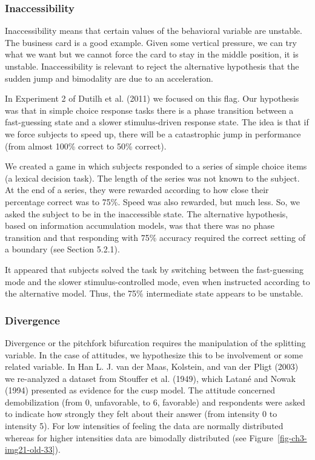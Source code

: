 \documentclass[
  letterpaper,
]{scrbook}
\begin{document}
\hypertarget{inaccessibility}{%
\subsubsection{Inaccessibility}\label{inaccessibility}}

Inaccessibility means that certain values of the behavioral variable are
unstable. The business card is a good example. Given some vertical
pressure, we can try what we want but we cannot force the card to stay
in the middle position, it is unstable. Inaccessibility is relevant to
reject the alternative hypothesis that the sudden jump and bimodality
are due to an acceleration.

In Experiment 2 of Dutilh et al. (2011) we focused on this flag. Our
hypothesis was that in simple choice response tasks there is a phase
transition between a fast-guessing state and a slower stimulus-driven
response state. The idea is that if we force subjects to speed up, there
will be a catastrophic jump in performance (from almost 100\% correct to
50\% correct).

We created a game in which subjects responded to a series of simple
choice items (a lexical decision task). The length of the series was not
known to the subject. At the end of a series, they were rewarded
according to how close their percentage correct was to 75\%. Speed was
also rewarded, but much less. So, we asked the subject to be in the
inaccessible state. The alternative hypothesis, based on information
accumulation models, was that there was no phase transition and that
responding with 75\% accuracy required the correct setting of a boundary
(see Section 5.2.1).

It appeared that subjects solved the task by switching between the
fast-guessing mode and the slower stimulus-controlled mode, even when
instructed according to the alternative model. Thus, the 75\%
intermediate state appears to be unstable.

\hypertarget{divergence}{%
\subsubsection{Divergence}\label{divergence}}

Divergence or the pitchfork bifurcation requires the manipulation of the
splitting variable. In the case of attitudes, we hypothesize this to be
involvement or some related variable. In Han L. J. van der Maas,
Kolstein, and van der Pligt (2003) we re-analyzed a dataset from
Stouffer et al. (1949), which Latané and Nowak (1994) presented as
evidence for the cusp model. The attitude concerned demobilization (from
0, unfavorable, to 6, favorable) and respondents were asked to indicate
how strongly they felt about their answer (from intensity 0 to intensity
5). For low intensities of feeling the data are normally distributed
whereas for higher intensities data are bimodally distributed (see
Figure~\ref{fig-ch3-img21-old-33}).
\end{document}
